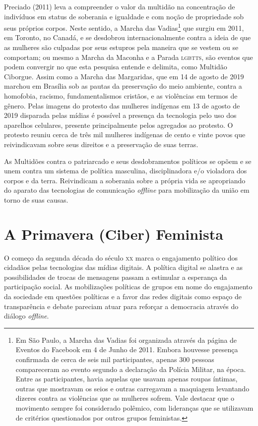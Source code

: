 Preciado (2011) leva a compreender o valor da multidão na concentração
de indivíduos em status de soberania e igualdade e com noção de
propriedade sob seus próprios corpos. Neste sentido, a Marcha das
Vadias\footnote{Em São Paulo, a Marcha das Vadias foi organizada através
  da página de Eventos do Facebook em 4 de Junho de 2011. Embora
  houvesse presença confirmada de cerca de seis mil participantes,
  apenas 300 pessoas compareceram ao evento segundo a declaração da
  Polícia Militar, na época. Entre as participantes, havia aquelas que
  usavam apenas roupas íntimas, outras que mostravam os seios e outras
  carregavam a maquiagem levantando dizeres contra as violências que as
  mulheres sofrem. Vale destacar que o movimento sempre foi considerado
  polêmico, com lideranças que se utilizavam de critérios questionados
  por outros grupos feministas.} que surgiu em 2011, em Toronto, no
Canadá, e se desdobrou internacionalmente contra a ideia de que as
mulheres são culpadas por seus estupros pela maneira que se vestem ou se
comportam; ou mesmo a Marcha da Maconha e a Parada \textsc{lgbtts}, são eventos
que podem convergir no que esta pesquisa entende e delimita, como
Multidão Ciborgue. Assim como a Marcha das Margaridas, que em 14 de
agosto de 2019 marchou em Brasília sob as pautas da preservação do meio
ambiente, contra a homofobia, racismo, fundamentalismos cristãos, e as
violências em termos de gênero. Pelas imagens do protesto das mulheres
indígenas em 13 de agosto de 2019 disparada pelas mídias é possível a
presença da tecnologia pelo uso dos aparelhos celulares, presente
principalmente pelos agregados ao protesto. O protesto reuniu cerca de
três mil mulheres indígenas de cento e vinte povos que reivindicavam
sobre seus direitos e a preservação de suas terras.

As Multidões contra o patriarcado e seus desdobramentos políticos se
opõem e se unem contra um sistema de política masculina, disciplinadora
e/o violadora dos corpos e da terra. Reivindicam a soberania sobre a
própria vida se apropriando do aparato das tecnologias de comunicação
\emph{offline} para mobilização da união em torno de suas causas.

\section{A Primavera (Ciber) Feminista}

\noindent{}O começo da segunda década do século \textsc{xx} marca o engajamento político dos
cidadãos pelas tecnologias das mídias digitais. A política digital se
alastra e as possibilidades de trocas de mensagens passam a estimular a
esperança da participação social. As mobilizações políticas de grupos em
nome do engajamento da sociedade em questões políticas e a favor das
redes digitais como espaço de transparência e debate pareciam atuar para
reforçar a democracia através do diálogo \emph{offline}.


